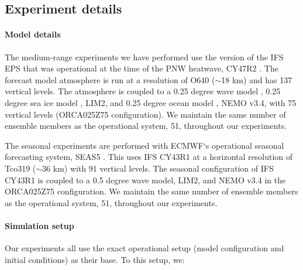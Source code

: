   \subsection*{Experiment details}
  
    \paragraph*{Model details}
  
      The medium-range experiments we have performed use the version of the IFS EPS that was operational at the time of the PNW heatwave, CY47R2 \cite{noauthor_ifs_2020}. The forecast model atmosphere is run at a resolution of O640 ($\sim$18 km) and has 137 vertical levels. The atmosphere is coupled to a 0.25 degree wave model \cite{janssen_interaction_2004}, 0.25 degree sea ice model \cite{fichefet_sensitivity_1997}, LIM2, and 0.25 degree ocean model \cite{madec_nemo_2008}, NEMO v3.4, with 75 vertical levels (ORCA025Z75 configuration). We maintain the same number of ensemble members as the operational system, 51, throughout our experiments.
    
      The seasonal experiments are performed with ECMWF`s operational seasonal forecasting system, SEAS5 \cite{johnson_seas5_2019}. This uses IFS CY43R1 \cite{noauthor_ifs_2016} at a horizontal resolution of Tco319 ($\sim$36 km) with 91 vertical levels. The seasonal configuration of IFS CY43R1 is coupled to a 0.5 degree wave model, LIM2, and NEMO v3.4 in the ORCA025Z75 configuration. We maintain the same number of ensemble members as the operational system, 51, throughout our experiments.
  
    \paragraph*{Simulation setup}
  
    Our experiments all use the exact operational setup (model configuration and initial conditions) as their base. To this setup, we:
  

